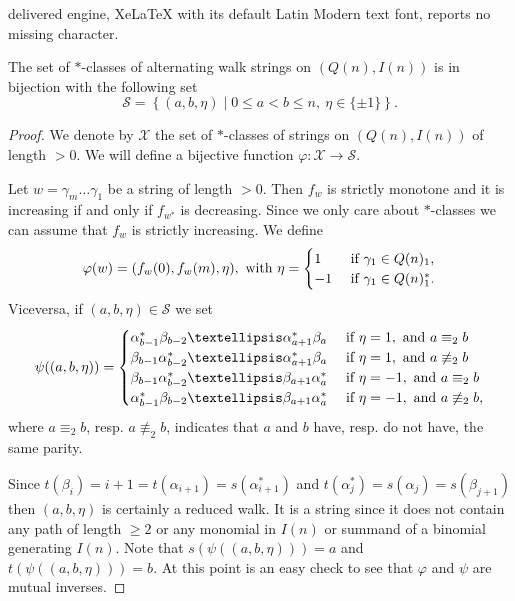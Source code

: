 \documentclass[10pt,a4paper]{amsart}
\begin{document}
delivered engine, XeLaTeX with its default Latin Modern text font, reports no missing character.
\begin{lemma}\label{ lemma : parameterisation of strings}%
The set of $*$-classes of alternating walk strings on $(Q(n), I(n))$ is in bijection with the following set
    \[
    \mathscr{S}=\left\{(a,b,\eta)\mid 0\leq a<b\leq n, \ \eta\in \{\pm1\} \right\}.
    \]
\end{lemma}

\begin{proof}
    We denote by $\mathscr{X}$ the set of $*$-classes of strings on $(Q(n), I(n))$ of length $>0$. 
    We will define a bijective function  $\varphi:\mathscr{X}\rightarrow \mathscr{S}$.

    Let $w=\gamma_m\ldots \gamma_1$ be a string of length $>0$. Then $f_w$ is strictly monotone and it is increasing if and only if $f_{w^*}$ is decreasing. Since we only care about $*$-classes we can assume that $f_w$ is strictly increasing. We define 
    \[
    \varphi(w)=(f_w(0), f_w(m), \eta), \hbox{ with }\eta=\begin{cases}
        1&\hbox{ if }\gamma_1\in Q(n)_1,\\
        -1&\hbox{ if }\gamma_1\in Q(n)_1^*.
    \end{cases}
    \]
    Viceversa, if $(a,b,\eta)\in\mathscr{S}$ we set
    \[
 \psi((a,b,\eta))=\begin{cases}
     \alpha_{b-1}^*\beta_{b-2}\ldots\alpha_{a+1}^*\beta_a &\hbox{ if }\eta=1, \hbox{ and }a\equiv_2 b\\
     \beta_{b-1}\alpha_{b-2}^*\ldots\alpha_{a+1}^*\beta_a &\hbox{ if }\eta=1, \hbox{ and }a\not\equiv_2 b\\
     \beta_{b-1}\alpha_{b-2}^*\ldots\beta_{a+1}\alpha_a^* &\hbox{ if }\eta=-1, \hbox{ and }a\equiv_2 b\\
     \alpha_{b-1}^*\beta_{b-2}\ldots\beta_{a+1}\alpha_{a}^* &\hbox{ if }\eta=-1, \hbox{ and }a\not\equiv_2 b,
 \end{cases}
    \]
    where $a\equiv_2 b$, resp. $a\not\equiv_2 b$, indicates that $a$ and $b$ have, resp. do not have, the same parity.
    
  Since $t(\beta_i)=i+1=t(\alpha_{i+1})=s(\alpha_{i+1}^*)$ and $t(\alpha_j^*)=s(\alpha_j)=s(\beta_{j+1})$ then $(a,b,\eta)$ is certainly a reduced walk. It is a string since it does not contain any path of length $\geq 2$ or any monomial in $I(n)$ or summand of a binomial generating $I(n)$. Note that $s(\psi((a,b,\eta)))=a$ and $t(\psi((a,b,\eta)))=b$. At this point is an easy check to see that $\varphi$ and $\psi$ are mutual inverses.
\end{proof}
\end{document}
